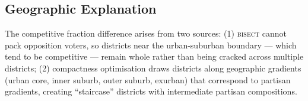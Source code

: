 \subsection{Geographic Explanation}

The competitive fraction difference arises from two sources:
(1) \textsc{bisect} cannot pack opposition voters, so districts near the
urban-suburban boundary --- which tend to be competitive --- remain whole
rather than being cracked across multiple districts;
(2) compactness optimisation draws districts along geographic gradients
(urban core, inner suburb, outer suburb, exurban) that correspond to
partisan gradients, creating ``staircase'' districts with intermediate
partisan compositions.
